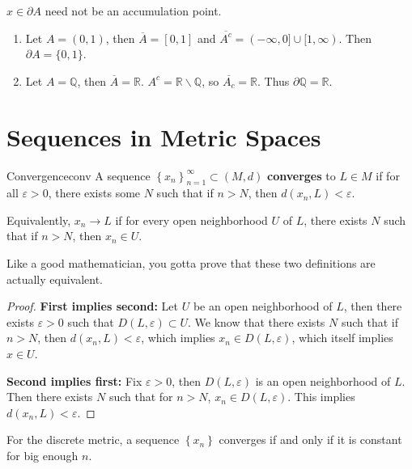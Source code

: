 \documentclass[10pt]{report}
\begin{document}
$x \in \partial A$ need not be an accumulation point.

\begin{ex}{}{}
	\begin{enumerate}
		\item Let $A=(0,1)$, then $\overline{A}=[0,1]$ and $\overline{A^c} =(-\infty,0] \cup[1,\infty)$. Then $\partial A = \{0,1\}$.
		\item Let $A=\mathbb{Q}$, then $\overline{A}=\mathbb{R}$. $A^c = \mathbb{R}\backslash \mathbb{Q}$, so $\overline{A_c} = \mathbb{R}$. Thus $\partial \mathbb{Q}=\mathbb{R}$.
	\end{enumerate}
\end{ex}



\section{Sequences in Metric Spaces}
\begin{defn}{Convergence}{conv}
	A sequence $\left\{ x_n \right\}_{n=1}^\infty \subset (M,d)$ \textbf{converges} to $L \in M$ if for all $\varepsilon>0$, there exists some $N$ such that if $n>N$, then  $d(x_n,L)<\varepsilon$.

	Equivalently, $x_n\to L$ if for every open neighborhood $U$ of $L$, there exists $N$ such that if $n>N$, then $x_n \in U$.
\end{defn}

Like a good mathematician, you gotta prove that these two definitions are actually equivalent.
\begin{proof}
	\textbf{First implies second:} Let $U$ be an open neighborhood of $L$, then there exists $\varepsilon>0$ such that $D(L,\varepsilon) \subset U$. We know that there exists $N$ such that if $n>N$, then $d(x_n,L)<\varepsilon$, which implies $x_n \in D(L,\varepsilon)$, which itself implies $x\in U$.

	\textbf{Second implies first:} Fix $\varepsilon>0$, then $D(L,\varepsilon)$ is an open neighborhood of $L$. Then there exists $N$ such that for $n>N$, $x_n \in D(L,\varepsilon)$. This implies $d(x_n, L) < \varepsilon$.
\end{proof}

\begin{ex}{}{}
	For the discrete metric, a sequence $\left\{ x_n \right\}$ converges if and only if it is constant for big enough $n$.
\end{ex}
\end{document}
